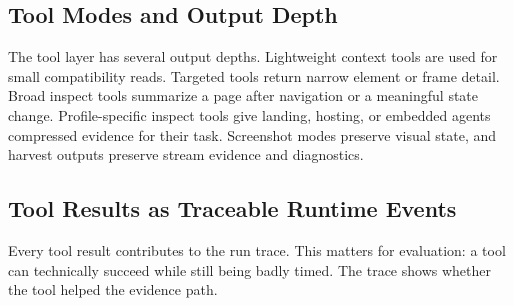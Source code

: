 \subsection{Tool Modes and Output Depth}

The tool layer has several output depths. Lightweight context tools are used
for small compatibility reads. Targeted tools return narrow element or frame
detail. Broad inspect tools summarize a page after navigation or a meaningful
state change. Profile-specific inspect tools give landing, hosting, or
embedded agents compressed evidence for their task. Screenshot modes preserve
visual state, and harvest outputs preserve stream evidence and diagnostics.

\subsection{Tool Results as Traceable Runtime Events}

Every tool result contributes to the run trace. This matters for evaluation:
a tool can technically succeed while still being badly timed. The trace shows
whether the tool helped the evidence path.

